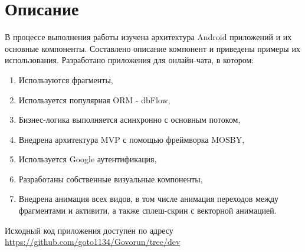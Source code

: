 \chapter{Описание}

В процессе выполнения работы изучена архитектура Android приложений и их основные компоненты. Составлено описание компонент и приведены примеры их использования. Разработано приложения для онлайн-чата, в котором:
\begin{enumerate}
	\item Используются фрагменты,
	\item Используется популярная ORM - dbFlow,
	\item Бизнес-логика выполняется асинхронно с основным потоком,
	\item Внедрена архитектура MVP с помощью фреймворка MOSBY,
	\item Используется Google аутентификация,
	\item Разработаны собственные визуальные компоненты,
	\item Внедрена анимация всех видов, в том числе анимация переходов между фрагментами и активити, а также сплеш-скрин с векторной анимацией.
\end{enumerate}

 Исходный код приложения доступен по адресу \href{https://github.com/goto1134/Govorun/tree/dev}{https://github.com/goto1134/Govorun/tree/dev}
	